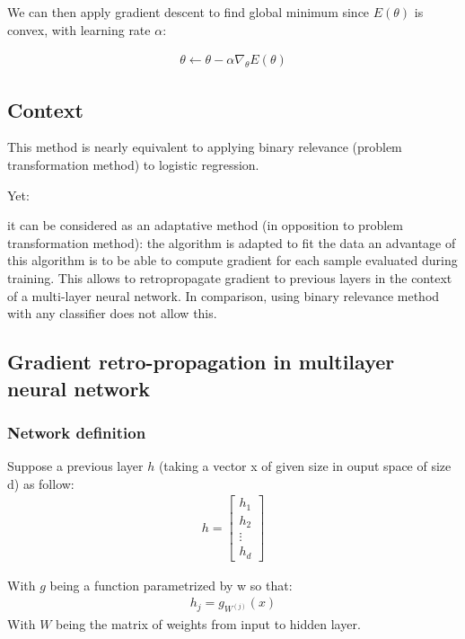 We can then apply gradient descent to find global minimum since $E(\theta)$ is convex, with learning rate $\alpha$:

\begin{align}
	\theta \leftarrow \theta - \alpha \nabla_\theta E(\theta)
\end{align}



\subsection*{Context}

This method is nearly equivalent to applying binary relevance (problem transformation method) to logistic regression.

Yet:
\begin{outline}
\1 it can be considered as an adaptative method (in opposition to problem transformation method): the algorithm is adapted to fit the data
\1 an advantage of this algorithm is to be able to compute gradient for each sample evaluated during training. This allows to retropropagate gradient to previous layers in the context of a multi-layer neural network. In comparison, using binary relevance method with any classifier does not allow this.
\end{outline}



\pagebreak

\subsection*{Gradient retro-propagation in multilayer neural network}

\subsubsection*{Network definition}

Suppose a previous layer $h$ (taking a vector x of given size in ouput space of size d) as follow:
\begin{align}
	h = 
	\begin{bmatrix} 
		h_1 \\
		h_2 \\
		\vdots \\
		h_d
	\end{bmatrix}
\end{align}


With $g$ being a function parametrized by w so that:
\begin{align}
	h_j = g_{W^{(j)}}(x)
\end{align}
With $W$ being the matrix of weights from input to hidden layer.


